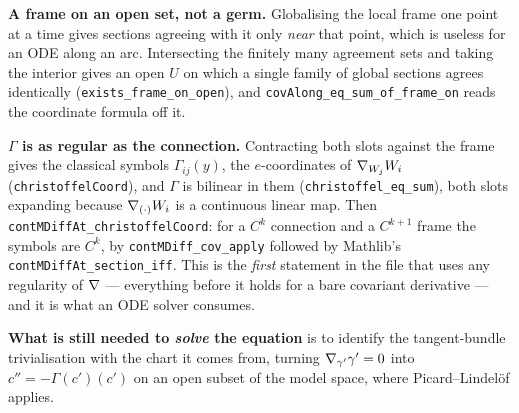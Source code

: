\begin{definition}
  \textbf{A frame on an open set, not a germ.} Globalising the local frame one
  point at a time gives sections agreeing with it only \emph{near} that point,
  which is useless for an ODE along an arc. Intersecting the finitely many
  agreement sets and taking the interior gives an open $U$ on which a single
  family of global sections agrees identically
  (\texttt{exists\_frame\_on\_open}), and
  \texttt{covAlong\_eq\_sum\_of\_frame\_on} reads the coordinate formula off it.

  \textbf{$\Gamma$ is as regular as the connection.} Contracting both slots
  against the frame gives the classical symbols $\Gamma_{ij}(y)$, the
  $e$-coordinates of $\nabla_{W_j}W_i$ (\texttt{christoffelCoord}), and
  $\Gamma$ is bilinear in them (\texttt{christoffel\_eq\_sum}), both slots
  expanding because $\nabla_{(\cdot)}W_i$ is a continuous linear map. Then
  \texttt{contMDiffAt\_christoffelCoord}: for a $C^k$ connection and a
  $C^{k+1}$ frame the symbols are $C^k$, by \texttt{contMDiff\_cov\_apply}
  followed by Mathlib's \texttt{contMDiffAt\_section\_iff}. This is the
  \emph{first} statement in the file that uses any regularity of $\nabla$ ---
  everything before it holds for a bare covariant derivative --- and it is
  what an ODE solver consumes.

  \textbf{What is still needed to \emph{solve} the equation} is to identify
  the tangent-bundle trivialisation with the chart it comes from, turning
  $\nabla_{\gamma'}\gamma' = 0$ into $c'' = -\Gamma(c')(c')$ on an open subset of
  the model space, where Picard--Lindel\"of applies.
\end{definition}

